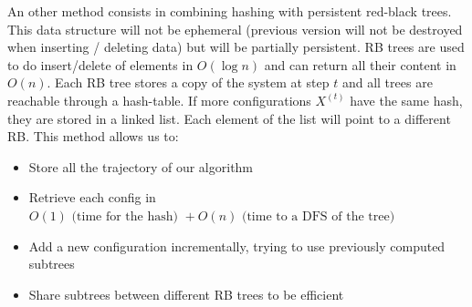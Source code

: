 \documentclass[11pt]{article}
\begin{document}
An other method consists in combining hashing with persistent red-black trees. This data structure will not be ephemeral (previous version will not be destroyed when inserting / deleting data) but will be partially persistent. RB trees are used to do insert/delete of elements in $O(\log n)$ and can return all their content in $O(n)$. Each RB tree stores a copy of the system at step $t$ and all trees are reachable through a hash-table. If more configurations $X^{(t)}$ have the same hash, they are stored in a linked list. Each element of the list will point to a different RB. This method allows us to:
\begin{itemize}
\item{Store all the trajectory of our algorithm}
\item{Retrieve each config in $O(1) \text{ (time for the hash) } + O(n) \text{ (time to a DFS of the tree) }$ }
\item{Add a new configuration incrementally, trying to use previously computed subtrees}
\item{Share subtrees between different RB trees to be efficient}
\end{itemize}

 
\end{document}
